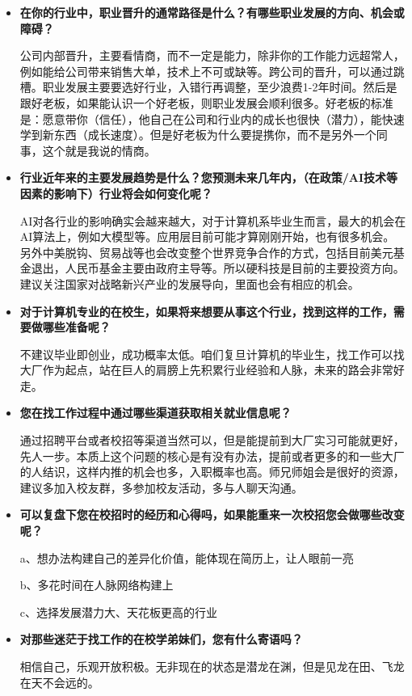 \begin{itemize}
    \item \textbf{在你的行业中，职业晋升的通常路径是什么？有哪些职业发展的方向、机会或障碍？}

公司内部晋升，主要看情商，而不一定是能力，除非你的工作能力远超常人，例如能给公司带来销售大单，技术上不可或缺等。跨公司的晋升，可以通过跳槽。职业发展主要要选好行业，入错行再调整，至少浪费1-2年时间。然后是跟好老板，如果能认识一个好老板，则职业发展会顺利很多。好老板的标准是：愿意带你（信任），他自己在公司和行业内的成长也很快（潜力），能快速学到新东西（成长速度）。但是好老板为什么要提携你，而不是另外一个同事，这个就是我说的情商。

    \item \textbf{行业近年来的主要发展趋势是什么？您预测未来几年内，（在政策/AI技术等因素的影响下）行业将会如何变化呢？}

AI对各行业的影响确实会越来越大，对于计算机系毕业生而言，最大的机会在AI算法上，例如大模型等。应用层目前可能才算刚刚开始，也有很多机会。
另外中美脱钩、贸易战等也会改变整个世界竞争合作的方式，包括目前美元基金退出，人民币基金主要由政府主导等。所以硬科技是目前的主要投资方向。建议关注国家对战略新兴产业的发展导向，里面也会有相应的机会。

    \item \textbf{对于计算机专业的在校生，如果将来想要从事这个行业，找到这样的工作，需要做哪些准备呢？}

不建议毕业即创业，成功概率太低。咱们复旦计算机的毕业生，找工作可以找大厂作为起点，站在巨人的肩膀上先积累行业经验和人脉，未来的路会非常好走。

    \item \textbf{您在找工作过程中通过哪些渠道获取相关就业信息呢？}

通过招聘平台或者校招等渠道当然可以，但是能提前到大厂实习可能就更好，先人一步。本质上这个问题的核心是有没有办法，提前或者更多的和一些大厂的人结识，这样内推的机会也多，入职概率也高。师兄师姐会是很好的资源，建议多加入校友群，多参加校友活动，多与人聊天沟通。

    \item \textbf{可以复盘下您在校招时的经历和心得吗，如果能重来一次校招您会做哪些改变呢？}

a、想办法构建自己的差异化价值，能体现在简历上，让人眼前一亮

b、多花时间在人脉网络构建上

c、选择发展潜力大、天花板更高的行业

    \item \textbf{对那些迷茫于找工作的在校学弟妹们，您有什么寄语吗？}

相信自己，乐观开放积极。无非现在的状态是潜龙在渊，但是见龙在田、飞龙在天不会远的。

\end{itemize}
